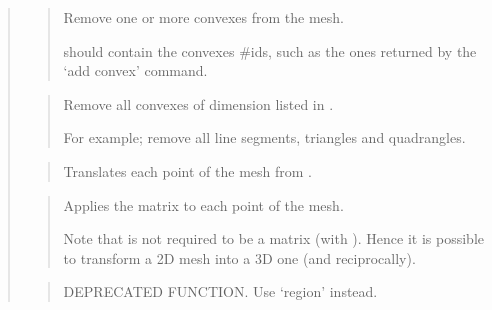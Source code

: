 \documentclass[a4paper,11pt,english]{sphinxmanual}
\begin{document}
\begin{quote}
\sphinxAtStartPar
{}
\begin{quote}

\sphinxAtStartPar
Remove one or more convexes from the mesh.

\sphinxAtStartPar
{} should contain the convexes \#ids, such as the ones
returned by the ‘add convex’ command.
\end{quote}

\sphinxAtStartPar
{}
\begin{quote}

\sphinxAtStartPar
Remove all convexes of dimension listed in .

\sphinxAtStartPar
For example;  remove
all line segments, triangles and quadrangles.
\end{quote}

\sphinxAtStartPar
{}
\begin{quote}

\sphinxAtStartPar
Translates each point of the mesh from .
\end{quote}

\sphinxAtStartPar
{}
\begin{quote}

\sphinxAtStartPar
Applies the matrix  to each point of the mesh.

\sphinxAtStartPar
Note that  is not required to be a  matrix (with
). Hence it is possible to transform
a 2D mesh into a 3D one (and reciprocally).
\end{quote}

\sphinxAtStartPar
{}
\begin{quote}

\sphinxAtStartPar
DEPRECATED FUNCTION. Use ‘region’ instead.
\end{quote}


\end{quote}
\end{document}
